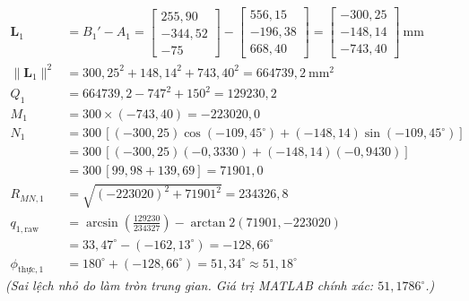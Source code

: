 \documentclass[12pt,a4paper]{article}
\newcommand{\Lvec}{\mathbf{L}}
\begin{document}
\begin{numbox}[frametitle={Ví dụ: Chân 1 tại home; $\mathbf{p}{=}[0{,}0{,}-75]^T$ mm; $\mathbf{R}{=}I$}]
\begin{align*}
  \Lvec_1 &= B_1' - A_1 = \begin{bmatrix}255{,}90\\-344{,}52\\-75\end{bmatrix}
             - \begin{bmatrix}556{,}15\\-196{,}38\\668{,}40\end{bmatrix}
           = \begin{bmatrix}-300{,}25\\-148{,}14\\-743{,}40\end{bmatrix}\ \text{mm}\\[4pt]
  \|\Lvec_1\|^2 &= 300{,}25^2 + 148{,}14^2 + 743{,}40^2 = 664739{,}2\ \text{mm}^2\\[4pt]
  Q_1 &= 664739{,}2 - 747^2 + 150^2 = 129230{,}2\\[4pt]
  M_1 &= 300 \times (-743{,}40) = -223020{,}0\\[4pt]
  N_1 &= 300\,[(-300{,}25)\cos(-109{,}45^{\circ}) + (-148{,}14)\sin(-109{,}45^{\circ})]\\
       &= 300\,[(-300{,}25)(-0{,}3330) + (-148{,}14)(-0{,}9430)]\\
       &= 300\,[99{,}98 + 139{,}69] = 71901{,}0\\[4pt]
  R_{MN{,}1} &= \sqrt{(-223020)^2 + 71901^2} = 234326{,}8\\[4pt]
  q_{1,\text{raw}} &= \arcsin\!\left(\tfrac{129230}{234327}\right) - \arctan2(71901{,}-223020)\\
                   &= 33{,}47^{\circ} - (-162{,}13^{\circ}) = -128{,}66^{\circ}\\[4pt]
  \phi_{\text{thực},1} &= 180^{\circ} + (-128{,}66^{\circ}) = 51{,}34^{\circ} \approx 51{,}18^{\circ}
\end{align*}
\textit{(Sai lệch nhỏ do làm tròn trung gian. Giá trị MATLAB chính xác: $51{,}1786^{\circ}$.)}
\end{numbox}
\end{document}
